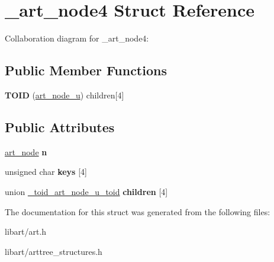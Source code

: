 \hypertarget{struct__art__node4}{}\section{\+\_\+art\+\_\+node4 Struct Reference}
\label{struct__art__node4}


Collaboration diagram for \+\_\+art\+\_\+node4\+:
\subsection*{Public Member Functions}
\begin{DoxyCompactItemize}
\item 
\mbox{\label{struct__art__node4_a4bdf49c0fa04557a729c3cd976d5c607}} 
{\bfseries T\+O\+ID} (\hyperlink{struct__art__node__u}{art\+\_\+node\+\_\+u}) children\mbox{[}4\mbox{]}
\end{DoxyCompactItemize}
\subsection*{Public Attributes}
\begin{DoxyCompactItemize}
\item 
\mbox{\label{struct__art__node4_a0415ddf340cef55b6dbf6449666b47d8}} 
\hyperlink{struct__art__node}{art\+\_\+node} {\bfseries n}
\item 
\mbox{\label{struct__art__node4_ac46521df7b3fe39ccef684639590ce11}} 
unsigned char {\bfseries keys} \mbox{[}4\mbox{]}
\item 
\mbox{\label{struct__art__node4_a25f2d86c7c050ef4922ca8e6354550e3}} 
union \hyperlink{union__toid__art__node__u__toid}{\+\_\+toid\+\_\+art\+\_\+node\+\_\+u\+\_\+toid} {\bfseries children} \mbox{[}4\mbox{]}
\end{DoxyCompactItemize}


The documentation for this struct was generated from the following files\+:\begin{DoxyCompactItemize}
\item 
libart/art.\+h\item 
libart/arttree\+\_\+structures.\+h\end{DoxyCompactItemize}
